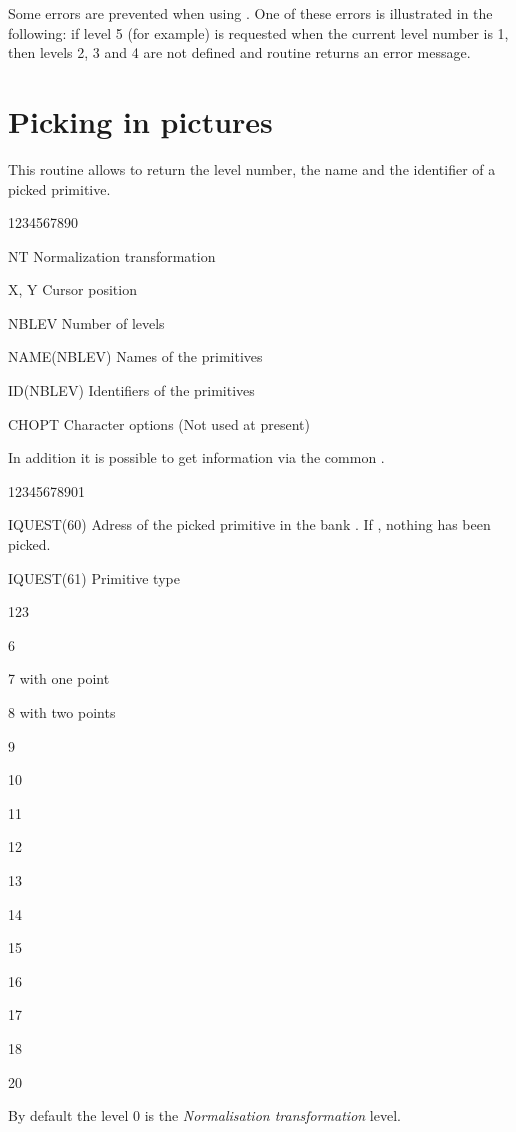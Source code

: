 Some errors are prevented when using . One of these
errors is illustrated in the following:
if level 5 (for example) is requested when
the current level number is 1, then levels 2, 3 and 4
are not defined and  routine  returns an error message.

\section{Picking in \HIGZ{} pictures}
\Action
This routine allows to return the level number, the name and the
identifier of a picked primitive.
\Pdesc
\begin{DLtt}{1234567890}
   \item[NT] Normalization transformation
   \item[X, Y] Cursor position
   \item[NBLEV] Number of levels
   \item[NAME(NBLEV)] Names of the primitives
   \item[ID(NBLEV)] Identifiers of the primitives
   \item[CHOPT] Character options (Not used at present)
\end{DLtt}
In addition it is possible to get information via the common \QUEST.
\begin{DLtt}{12345678901}
   \item[IQUEST(60)] Adress of the picked primitive in the bank . 
               If , nothing has been picked.
   \item[IQUEST(61)] Primitive type
   \begin{DLtt}{123}
      \item[6] 
      \item[7]  with one point
      \item[8]  with two points
      \item[9] 
      \item[10] 
      \item[11] 
      \item[12] 
      \item[13] 
      \item[14] 
      \item[15] 
      \item[16] 
      \item[17] 
      \item[18] 
      \item[20] 
   \end{DLtt}
\end{DLtt}
\par
By default the level 0 is the {\it Normalisation transformation} level.

